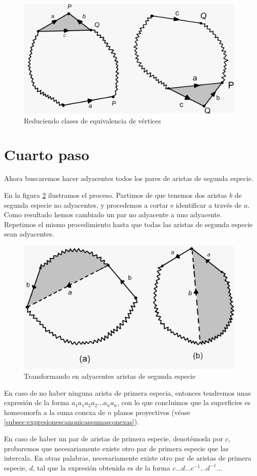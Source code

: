 \documentclass[a4paper,11pt,spanish, twoside, leqno]{tfg-uam}
\theoremstyle{definition}
\begin{document}
\begin{figure}[h!]
	\centering
	\includegraphics[width=0.4\linewidth]{imagenes/paso3.jpeg}
	\caption{Reduciendo clases de equivalencia de vértices}
	\label{fig:paso3}
\end{figure}


\section{Cuarto paso}

Ahora buscaremos hacer adyacentes todos los pares de aristas de segunda especie.

En la figura \ref{fig:paso4} ilustramos el proceso. Partimos de que tenemos dos aristas $b$ de segunda especie no adyacentes, y procedemos a cortar e identificar a través de $a$. Como resultado hemos cambiado un par no adyacente a uno adyacente. Repetimos el mismo procedimiento hasta que todas las aristas de segunda especie sean adyacentes.

\begin{figure}[h!]
	\centering
	\includegraphics[width=0.4\linewidth]{imagenes/paso4.jpeg}
	\caption{Transformando en adyacentes aristas de segunda especie}
	\label{fig:paso4}
\end{figure}

En caso de no haber ninguna arista de primera especia, entonces tendremos unas expresión de la forma $a_1a_1a_2a_2...a_na_n$, con lo que concluimos que la superficies es homeomorfa a la suma conexa de $n$ planos proyectivos (véase \ref{subsec:expresionescanonicassumasconexas}).

En caso de haber un par de  aristas de primera especie, denotémosla por $c$, probaremos que necesariamente existe otro par de primera especie que las intercala. En otras palabras, necesariamente existe otro par de aristas de primera especie, $d$, tal que la expresión obtenida es de la forma $c...d...c^{-1}...d^{-1}...$
\end{document}
